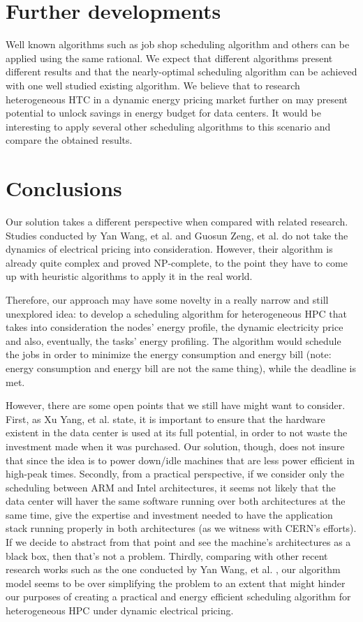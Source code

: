 \section{Further developments}

Well known algorithms such as job shop scheduling algorithm and others can be applied using the same rational. We expect that different algorithms present different results and that the nearly-optimal scheduling algorithm can be achieved with one well studied existing algorithm. We believe that to research heterogeneous HTC in a dynamic energy pricing market further on may present potential to unlock savings in energy budget for data centers. It would be interesting to apply several other scheduling algorithms to this scenario and compare the obtained results.

\section{Conclusions}

Our solution takes a different perspective when compared with related research. Studies conducted by Yan Wang, et al.  \cite{TASK_SCHED} and Guosun Zeng, et al. \cite{EXE_METHOD} do not take the
dynamics of electrical pricing into consideration. However, their algorithm is
already quite complex and proved NP-complete, to the point they have to come up
with heuristic algorithms to apply it in the real world.

Therefore, our approach may have some novelty in a really narrow and still
unexplored idea: to develop a scheduling algorithm for heterogeneous HPC that
takes into consideration the nodes' energy profile, the dynamic electricity
price and also, eventually, the tasks' energy profiling. The algorithm would
schedule the jobs in order to minimize the energy consumption and energy bill
(note: energy consumption and energy bill are not the same thing), while the
deadline is met. 

However, there are some open points that we still have might want to
consider. First, as Xu Yang, et al. \cite{DYN_PRICING_HPC} state, it is important to ensure
that the hardware existent in the data center is used at its full potential, in
order to not waste the investment made when it was purchased. Our solution,
though, does not insure that since the idea is to power down/idle machines that 
are less power efficient in high-peak times. Secondly, from a practical
perspective, if we consider only the scheduling between ARM and Intel architectures, 
it seems not likely that the data center will haver the same software running
over both architectures at the same time, give the expertise and investment
needed to have the application stack running properly in both architectures (as
we witness with CERN's efforts). If we decide to abstract from that point and
see the machine's architectures as a black box, then that's not a problem. Thirdly, 
comparing with other recent research works
such as the one conducted by Yan Wang, et al. \cite{TASK_SCHED}, our algorithm model seems to be over simplifying the
problem to an extent that might hinder our purposes of creating a practical and
energy efficient scheduling algorithm for heterogeneous HPC under dynamic
electrical pricing.

